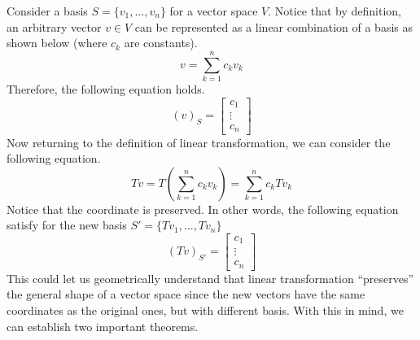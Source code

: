 \documentclass[../main.tex]{subfiles}
\begin{document}
Consider a basis $S = \{ v_1, \ldots, v_n \}$ for a vector space $V$.
Notice that by definition, an arbitrary vector $v \in V$ can be
represented as a linear combination of a basis as shown below
(where $c_k$ are constants).
\[
v = \sum_{k=1}^n c_k v_k
\]
Therefore, the following equation holds.
\[
(v)_S =
\begin{bmatrix}
    c_1 \\
    \vdots \\
    c_n
\end{bmatrix}
\]
Now returning to the definition of linear transformation, we can
consider the following equation.
\[
Tv
= T \left( \sum_{k=1}^n c_k v_k \right)
= \sum_{k=1}^n c_k Tv_k
\]
Notice that the coordinate is preserved. In other words, the
following equation satisfy for the new basis $S' = \{ Tv_1, \ldots,
Tv_n \}$
\[
(Tv)_{S'} =
\begin{bmatrix}
    c_1 \\
    \vdots \\
    c_n
\end{bmatrix}
\]
This could let us geometrically understand that linear transformation
``preserves'' the general shape of a vector space since the new
vectors have the same coordinates as the original ones, but with
different basis. With this in mind, we can establish two important
theorems.
\end{document}
